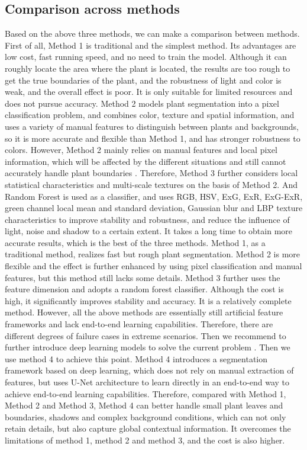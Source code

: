 \documentclass[conference]{IEEEtran}
\begin{document}
\subsection{Comparison across methods}
Based on the above three methods, we can make a comparison between methods.
First of all, Method 1 is traditional and the simplest method. Its advantages are low cost, fast running speed, and no need to train the model. Although it can roughly locate the area where the plant is located, the results are too rough to get the true boundaries of the plant, and the robustness of light and color is weak, and the overall effect is poor. It is only suitable for limited resources and does not pursue accuracy. Method 2 models plant segmentation into a pixel classification problem, and combines color, texture and spatial information, and uses a variety of manual features to distinguish between plants and backgrounds, so it is more accurate and flexible than Method 1, and has stronger robustness to colors. However, Method 2 mainly relies on manual features and local pixel information, which will be affected by the different situations and still cannot accurately handle plant boundaries \cite{survey}. Therefore, Method 3 further considers local statistical characteristics and multi-scale textures on the basis of Method 2. And Random Forest is used as a classifier, and uses RGB, HSV, ExG, ExR, ExG-ExR, green channel local mean and standard deviation, Gaussian blur and LBP texture characteristics to improve stability and robustness, and reduce the influence of light, noise and shadow to a certain extent. It takes a long time to obtain more accurate results, which is the best of the three methods.
Method 1, as a traditional method, realizes fast but rough plant segmentation. Method 2 is more flexible and the effect is further enhanced by using pixel classification and manual features, but this method still lacks some details. Method 3 further uses the feature dimension and adopts a random forest classifier. Although the cost is high, it significantly improves stability and accuracy. It is a relatively complete method. However, all the above methods are essentially still artificial feature frameworks and lack end-to-end learning capabilities. Therefore, there are different degrees of failure cases in extreme scenarios. Then we recommend to further introduce deep learning models to solve the current problem \cite{survey}. Then we use method 4 to achieve this point. Method 4 introduces a segmentation framework based on deep learning, which does not rely on manual extraction of features, but uses U-Net architecture to learn directly in an end-to-end way to achieve end-to-end learning capabilities. Therefore, compared with Method 1, Method 2 and Method 3, Method 4 can better handle small plant leaves and boundaries, shadows and complex background conditions, which can not only retain details, but also capture global contextual information. It overcomes the limitations of method 1, method 2 and method 3, and the cost is also higher.
\end{document}
